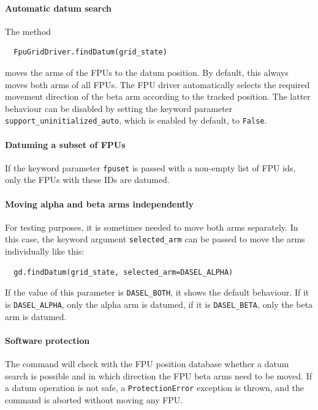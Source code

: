 \documentclass[fontsize=12,a4paper]{scrreprt}
\begin{document}
\paragraph{Automatic datum search}

The method
\begin{verbatim}
  FpuGridDriver.findDatum(grid_state)
\end{verbatim}
moves the arms of the FPUs to the datum position.  By default, this
always moves both arms of all FPUs. The FPU driver automatically
selects the required movement direction of the beta arm according to
the tracked position. The latter behaviour can be disabled by setting
the keyword parameter \texttt{support\_uninitialized\_auto}, which is
enabled by default, to \texttt{False}.

\paragraph{Datuming a subset of FPUs}

If the keyword parameter \texttt{fpuset} is passed with a non-empty
list of FPU ids, only the FPUs with these IDs are datumed.


\paragraph{Moving alpha and beta arms independently}

For testing purposes, it is sometimes needed to move both arms
separately.  In this case, the keyword argument
\texttt{selected\_arm} can be passed to move the arms individually
like this:

\begin{verbatim}
  gd.findDatum(grid_state, selected_arm=DASEL_ALPHA)
\end{verbatim}

\begin{sloppypar}
If the value of this parameter is \texttt{DASEL\_BOTH}, it shows the
default behaviour. If it is \texttt{DASEL\_ALPHA}, only the alpha arm
is datumed, if it is \texttt{DASEL\_BETA}, only the beta arm is
datumed.
\end{sloppypar}

\paragraph{Software protection}
The command will check with the FPU position database whether a datum
search is possible and in which direction the FPU beta arms need to be
moved. If a datum operation is not safe, a \texttt{ProtectionError}
exception is thrown, and the command is aborted without moving any
FPU.
\end{document}
